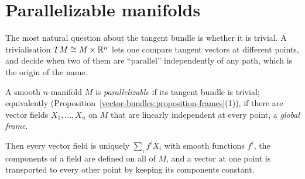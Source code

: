\section{Parallelizable manifolds}\label{vector-bundles:section-parallelizable}

The most natural question about the tangent bundle is whether it is trivial. A trivialisation $TM \cong M \times \mathbb{R}^n$ lets one compare tangent vectors at different points, and decide when two of them
are ``parallel'' independently of any path, which is the origin of the name.

\begin{definition}\label{vector-bundles:definition-parallelizable}
A smooth $n$-manifold $M$ is \emph{parallelizable} if its tangent bundle is trivial; equivalently (Proposition~\ref{vector-bundles:proposition-frames}(1)), if there are vector fields $X_1, \ldots, X_n$ on $M$ that are
linearly independent at every point, a \emph{global frame}.
\end{definition}

Then every vector field is uniquely $\sum_if^iX_i$ with smooth functions $f^i$, the components of a field are defined on all of $M$, and a vector at one point is transported to every other point by
keeping its components constant.

